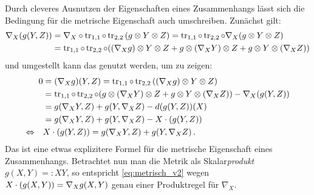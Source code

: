 \documentclass[../H_Analysis_main.tex]{subfiles}
\begin{document}
Durch cleveres Ausnutzen der Eigenschaften eines Zusammenhangs lässt sich die Bedingung für die metrische Eigenschaft auch umschreiben. Zunächst gilt:
\begin{align*}
\nabla_X \qty(g(Y, Z)) &= \nabla_X \circ \tr_{1, 1} \circ \tr_{2, 2} \qty(g \otimes Y \otimes Z) = \tr_{1, 1} \circ \tr_{2, 2} \circ \nabla_X \qty(g \otimes Y \otimes Z) 
\\
&= \tr_{1, 1} \circ \tr_{2, 2} \circ \qty(\qty(\nabla_X g) \otimes Y \otimes Z + g \otimes \qty(\nabla_X Y) \otimes Z + g \otimes Y \otimes \qty(\nabla_X Z))
\end{align*}
und umgestellt kann das genutzt werden, um zu zeigen:
\begin{align}
0 &= \qty(\nabla_X g)(Y, Z) = \tr_{1, 1} \circ \tr_{2, 2} \qty(\qty(\nabla_X g) \otimes Y \otimes Z)
\notag\\
&= \tr_{1, 1} \circ \tr_{2, 2} \circ \qty(g \otimes \qty(\nabla_X Y) \otimes Z + g \otimes Y \otimes \qty(\nabla_X Z)) - \nabla_X \qty(g(Y, Z))
\notag\\
&= g\qty(\nabla_X Y, Z) + g\qty(Y, \nabla_X Z) - d \qty(g(Y, Z))(X)
\notag\\
&= g\qty(\nabla_X Y, Z) + g\qty(Y, \nabla_X Z) - X \cdot \qty(g(Y, Z))
\notag\\
\Leftrightarrow \quad & X \cdot \qty(g(Y, Z)) = g\qty(\nabla_X Y, Z) + g\qty(Y, \nabla_X Z) \, . \label{eq:metrisch_v2}
\end{align}
Das ist eine etwas explizitere Formel für die metrische Eigenschaft eines Zusammenhangs. Betrachtet nun man die Metrik als Skalar\emph{produkt} $g(X, Y) =: X Y$, so entspricht \eqref{eq:metrisch_v2} wegen $X \cdot \qty(g(X, Y)) = \nabla_X g(X, Y)$ genau einer Produktregel für $\nabla_X$.\\
\end{document}
